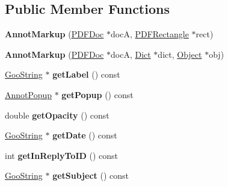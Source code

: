 \subsection*{Public Member Functions}
\begin{DoxyCompactItemize}
\item 
\mbox{\label{class_annot_markup_a8605da2978b4a93b17a44a3da0be7238}} 
{\bfseries Annot\+Markup} (\hyperlink{class_p_d_f_doc}{P\+D\+F\+Doc} $\ast$docA, \hyperlink{class_p_d_f_rectangle}{P\+D\+F\+Rectangle} $\ast$rect)
\item 
\mbox{\label{class_annot_markup_aa318464516ccc7bc58ae33989c025632}} 
{\bfseries Annot\+Markup} (\hyperlink{class_p_d_f_doc}{P\+D\+F\+Doc} $\ast$docA, \hyperlink{class_dict}{Dict} $\ast$dict, \hyperlink{class_object}{Object} $\ast$obj)
\item 
\mbox{\label{class_annot_markup_a72d1e57f56c7bc7a72c39d7c5a3c93ea}} 
\hyperlink{class_goo_string}{Goo\+String} $\ast$ {\bfseries get\+Label} () const
\item 
\mbox{\label{class_annot_markup_a9695557a2116985ac1b7effa667facf2}} 
\hyperlink{class_annot_popup}{Annot\+Popup} $\ast$ {\bfseries get\+Popup} () const
\item 
\mbox{\label{class_annot_markup_a8b0db78a3d602be7128f500dfffe8f83}} 
double {\bfseries get\+Opacity} () const
\item 
\mbox{\label{class_annot_markup_ae34e0771c288e34bdee8d07ba5b7777c}} 
\hyperlink{class_goo_string}{Goo\+String} $\ast$ {\bfseries get\+Date} () const
\item 
\mbox{\label{class_annot_markup_a88c2080d6821961df8fc84dcafc0ade5}} 
int {\bfseries get\+In\+Reply\+To\+ID} () const
\item 
\mbox{\label{class_annot_markup_a5e534eeff5c49e474b13de7e1089614a}} 
\hyperlink{class_goo_string}{Goo\+String} $\ast$ {\bfseries get\+Subject} () const
\item 
\mbox{\label{class_annot_markup_a8fca99805f9496450bec2ebe4ec4474a}} 

\end{DoxyCompactItemize}
